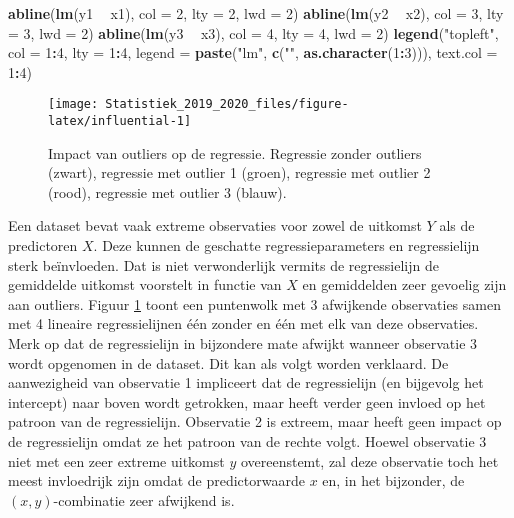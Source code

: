 \documentclass[12pt,dutch,coursenotes]{book}
\newenvironment{Shaded}{\begin{snugshade}}{\end{snugshade}}
\newcommand{\KeywordTok}[1]{\textcolor[rgb]{0.13,0.29,0.53}{\textbf{#1}}}
\newcommand{\DataTypeTok}[1]{\textcolor[rgb]{0.13,0.29,0.53}{#1}}
\newcommand{\DecValTok}[1]{\textcolor[rgb]{0.00,0.00,0.81}{#1}}
\newcommand{\StringTok}[1]{\textcolor[rgb]{0.31,0.60,0.02}{#1}}
\newcommand{\OperatorTok}[1]{\textcolor[rgb]{0.81,0.36,0.00}{\textbf{#1}}}
\newcommand{\NormalTok}[1]{#1}
\theoremstyle{definition}
\theoremstyle{definition}
\theoremstyle{definition}
\theoremstyle{remark}
\begin{document}
\begin{Shaded}
\begin{Highlighting}[]
\KeywordTok{abline}\NormalTok{(}\KeywordTok{lm}\NormalTok{(y1 }\OperatorTok{~}\StringTok{ }\NormalTok{x1), }\DataTypeTok{col =} \DecValTok{2}\NormalTok{, }\DataTypeTok{lty =} \DecValTok{2}\NormalTok{, }\DataTypeTok{lwd =} \DecValTok{2}\NormalTok{)}
\KeywordTok{abline}\NormalTok{(}\KeywordTok{lm}\NormalTok{(y2 }\OperatorTok{~}\StringTok{ }\NormalTok{x2), }\DataTypeTok{col =} \DecValTok{3}\NormalTok{, }\DataTypeTok{lty =} \DecValTok{3}\NormalTok{, }\DataTypeTok{lwd =} \DecValTok{2}\NormalTok{)}
\KeywordTok{abline}\NormalTok{(}\KeywordTok{lm}\NormalTok{(y3 }\OperatorTok{~}\StringTok{ }\NormalTok{x3), }\DataTypeTok{col =} \DecValTok{4}\NormalTok{, }\DataTypeTok{lty =} \DecValTok{4}\NormalTok{, }\DataTypeTok{lwd =} \DecValTok{2}\NormalTok{)}
\KeywordTok{legend}\NormalTok{(}\StringTok{"topleft"}\NormalTok{, }\DataTypeTok{col =} \DecValTok{1}\OperatorTok{:}\DecValTok{4}\NormalTok{, }\DataTypeTok{lty =} \DecValTok{1}\OperatorTok{:}\DecValTok{4}\NormalTok{, }\DataTypeTok{legend =} \KeywordTok{paste}\NormalTok{(}\StringTok{"lm"}\NormalTok{, }
    \KeywordTok{c}\NormalTok{(}\StringTok{""}\NormalTok{, }\KeywordTok{as.character}\NormalTok{(}\DecValTok{1}\OperatorTok{:}\DecValTok{3}\NormalTok{))), }\DataTypeTok{text.col =} \DecValTok{1}\OperatorTok{:}\DecValTok{4}\NormalTok{)}
\end{Highlighting}
\end{Shaded}

\begin{figure}

{\centering \texttt{[image: Statistiek\_2019\_2020\_files/figure-latex/influential-1]} 

}

\caption{Impact van outliers op de regressie. Regressie zonder outliers (zwart), regressie met outlier 1 (groen), regressie met outlier 2 (rood), regressie met outlier 3 (blauw).}\label{fig:influential}
\end{figure}

Een dataset bevat vaak extreme observaties voor zowel de uitkomst \(Y\)
als de predictoren \(X\). Deze kunnen de geschatte regressieparameters
en regressielijn sterk beïnvloeden. Dat is niet verwonderlijk vermits de
regressielijn de gemiddelde uitkomst voorstelt in functie van \(X\) en
gemiddelden zeer gevoelig zijn aan outliers. Figuur
\ref{fig:influential} toont een puntenwolk met 3 afwijkende observaties
samen met 4 lineaire regressielijnen één zonder en één met elk van deze
observaties. Merk op dat de regressielijn in bijzondere mate afwijkt
wanneer observatie 3 wordt opgenomen in de dataset. Dit kan als volgt
worden verklaard. De aanwezigheid van observatie 1 impliceert dat de
regressielijn (en bijgevolg het intercept) naar boven wordt getrokken,
maar heeft verder geen invloed op het patroon van de regressielijn.
Observatie 2 is extreem, maar heeft geen impact op de regressielijn
omdat ze het patroon van de rechte volgt. Hoewel observatie 3 niet met
een zeer extreme uitkomst \(y\) overeenstemt, zal deze observatie toch
het meest invloedrijk zijn omdat de predictorwaarde \(x\) en, in het
bijzonder, de \((x,y)\)-combinatie zeer afwijkend is.
\end{document}
